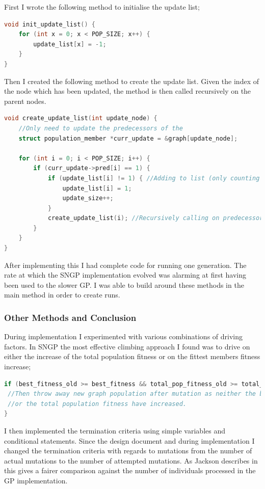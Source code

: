 \documentclass[a4paper,10.5pt]{article}
\begin{document}
First I wrote the following method to initialise the update list;


\begin{lstlisting}[language=C]
void init_update_list() {
	for (int x = 0; x < POP_SIZE; x++) {
		update_list[x] = -1;
	}
}
\end{lstlisting}

Then I created the following method to create the update list. Given the index of the node which has been updated, the method is then called recursively on the parent nodes.
\begin{lstlisting}[language=C]
void create_update_list(int update_node) {
	//Only need to update the predecessors of the 
	struct population_member *curr_update = &graph[update_node];

	for (int i = 0; i < POP_SIZE; i++) {
		if (curr_update->pred[i] == 1) {
			if (update_list[i] != 1) { //Adding to list (only counting repeated nodes once)
				update_list[i] = 1;
				update_size++;
			}
			create_update_list(i); //Recursively calling on predecessors
		}
	}
}
\end{lstlisting}

After implementing this I had complete code for running one generation. The rate at which the SNGP implementation evolved was alarming at first having been used to the slower GP. I was able to build around these methods in the main method in order to create runs.
\subsubsection{Other Methods and Conclusion}
During implementation I experimented with various combinations of driving factors. In SNGP the most effective climbing approach I found was to drive on either the increase of the total population fitness or on the fittest members fitness increase;
\begin{lstlisting}[language=C]
if (best_fitness_old >= best_fitness && total_pop_fitness_old >= total_pop_fitness) {
 //Then throw away new graph population after mutation as neither the best fitness
 //or the total population fitness have increased.
}
\end{lstlisting}

I then implemented the termination criteria using simple variables and conditional statements. Since the design document and during implementation I changed the termination criteria with regards to mutations from the number of actual mutations to the number of attempted mutations. As Jackson describes in \cite{jacksonsngp} this gives a fairer comparison against the number of individuals processed in the GP implementation.
\end{document}
